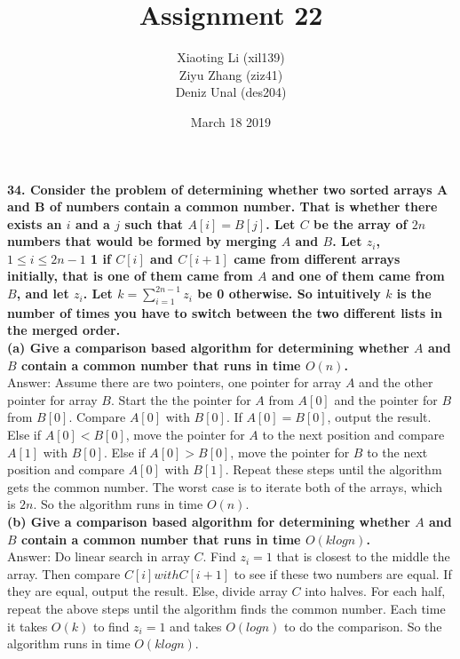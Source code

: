 \documentclass{article}
\title{Assignment 22}
\author{Xiaoting Li (xil139) \\
Ziyu Zhang (ziz41) \\
Deniz Unal (des204)}
\date{March 18 2019}
\begin{document}
\maketitle

\noindent
\textbf{34. Consider the problem of determining whether two sorted arrays A and B of numbers
contain a common number. That is whether there exists an $i$ and a $j$ such that
$A[i] = B[j]$. Let $C$ be the array of $2n$ numbers that would be formed by merging $A$
and $B$. Let $z_i$, $1 \leq i \leq 2n - 1$ 1 if $C[i]$ and $C[i + 1]$ came from different arrays initially, that is one of them came from $A$ and one of them came from $B$, and let $z_i$. Let $k = \sum_{i=1}^{2n-1}z_{i}$
be 0 otherwise. So intuitively $k$ is the number of times you have to switch between the two different lists in the merged order.} \\ \newline
\textbf{(a) Give a comparison based algorithm for determining whether $A$ and $B$ contain a
common number that runs in time $O(n)$.} \\ \newline
Answer: Assume there are two pointers, one pointer for array $A$ and the other pointer for array $B$. Start the the pointer for $A$ from $A[0]$ and the pointer for $B$ from $B[0]$. Compare $A[0]$ with $B[0]$. If $A[0] = B[0]$, output the result. Else if $A[0] < B[0]$, move the pointer for $A$ to the next position and compare $A[1]$ with $B[0]$. Else if $A[0] > B[0]$, move the pointer for $B$ to the next position and compare $A[0]$ with $B[1]$. Repeat these steps until the algorithm gets the common number. The worst case is to iterate both of the arrays, which is $2n$. So the algorithm runs in time $O(n)$.\\ \newline
\textbf{(b) Give a comparison based algorithm for determining whether $A$ and $B$ contain a
common number that runs in time $O(klogn)$.} \\ \newline
Answer: Do linear search in array $C$. Find $z_i = 1$ that is closest to the middle the array. Then compare $C[i] with C[i+1]$ to see if these two numbers are equal. If they are equal, output the result. Else, divide array $C$ into halves. For each half, repeat the above steps until the algorithm finds the common number. Each time it takes $O(k)$ to find $z_i = 1$ and takes $O(logn)$ to do the comparison. So the algorithm runs in time $O(klogn)$.\\ \newline
\end{document}
